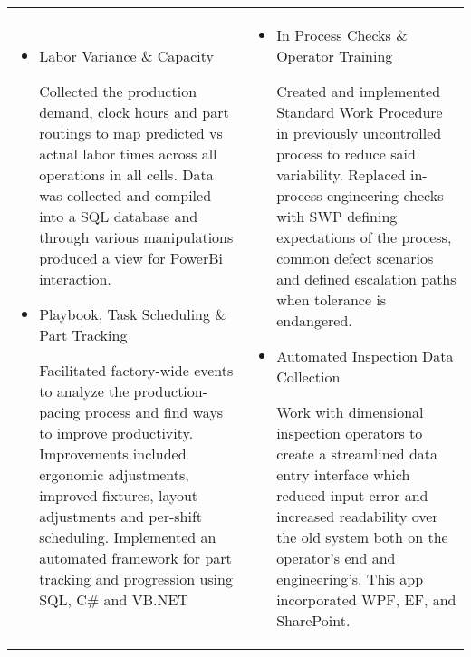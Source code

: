 \documentclass[a4paper, oneside, final, fontsize=9pt, usegeometry]{scrartcl} %
\newcommand{\Csharp}{C{\lserif\#}}
\begin{document}
\begin{center}
\begin{tabularx}{0.97\linewidth}{X|X}
    \vspace{-10pt}
    \begin{itemize}\setlength\itemsep{0em}
        \item{Labor Variance \&{} Capacity}
        \begin{sloppypar}
            Collected the production demand, clock hours and part routings to map predicted vs actual labor times across all operations in all cells.
            Data was collected and compiled into a SQL database and through various manipulations produced a view for PowerBi interaction.
        \end{sloppypar}
        \item{Playbook, Task Scheduling \&{} Part Tracking}
        \begin{sloppypar}
            Facilitated factory-wide events to analyze the production-pacing process and find ways to improve productivity.
            Improvements included ergonomic adjustments, improved fixtures, layout adjustments and per-shift scheduling.
            Implemented an automated framework for part tracking and progression using SQL, \Csharp{} and VB.NET
        \end{sloppypar}
    \end{itemize} & \vspace{-10pt} \begin{itemize}\setlength\itemsep{0em}
        \item{In Process Checks \&{} Operator Training}
        \begin{sloppypar}
            Created and implemented Standard Work Procedure in previously uncontrolled process to reduce said variability.
            Replaced in-process engineering checks with SWP defining expectations of the process, common defect scenarios
            and defined escalation paths when tolerance is endangered.
        \end{sloppypar}
        \item {Automated Inspection Data Collection}
        \begin{sloppypar}
            Work with dimensional inspection operators to create a streamlined data entry interface which reduced
            input error and increased readability over the old system both on the operator's end and engineering's. This
            app incorporated WPF, EF, and SharePoint.
        \end{sloppypar}
    \end{itemize}
\end{tabularx}


\end{center}
\end{document}
